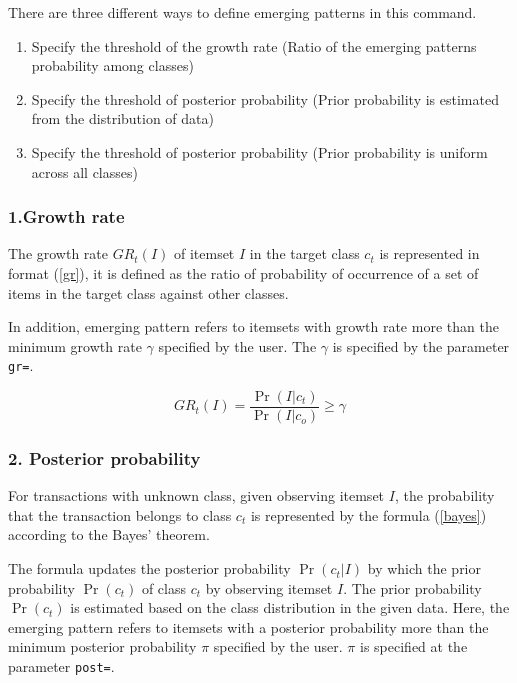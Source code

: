 There are three different ways to define emerging patterns in this command.

\begin{enumerate}
\item Specify the threshold of the growth rate (Ratio of the emerging patterns probability among classes)
\item Specify the threshold of posterior probability (Prior probability is estimated from the distribution of data)
\item Specify the threshold of posterior probability (Prior probability is uniform across all  classes)
\end{enumerate}

\subsubsection*{1.Growth rate}

The growth rate $GR_t(I)$ of itemset $I$ in the target class $c_t$ is represented in  format (\ref{gr}), it is defined as the ratio of probability of occurrence of a set of items in the target class against other classes.  

In addition, emerging pattern refers to itemsets with growth rate more than the minimum growth rate $\gamma$ specified by the user.  The $\gamma$ is specified by the parameter \verb|gr=|.

\begin{equation}
GR_t(I)=\frac{\Pr(I|c_t)}{\Pr(I|c_o)} \ge \gamma \label{gr}
\end{equation}


\subsubsection*{2. Posterior probability}


For transactions with unknown class, given observing itemset $I$, the probability that the transaction belongs to class $c_t$ is represented by the formula (\ref{bayes}) according to the Bayes' theorem.

The formula updates the posterior probability $\Pr(c_t|I)$ by which the prior probability $\Pr(c_t)$ of class $c_t$ by observing itemset $I$.
The prior probability $\Pr(c_t)$ is estimated based on the class distribution in the given data.
Here, the emerging pattern refers to itemsets with a posterior probability more than the minimum posterior probability $\pi$ specified by the user.  $\pi$ is specified at the parameter \verb|post=|.

